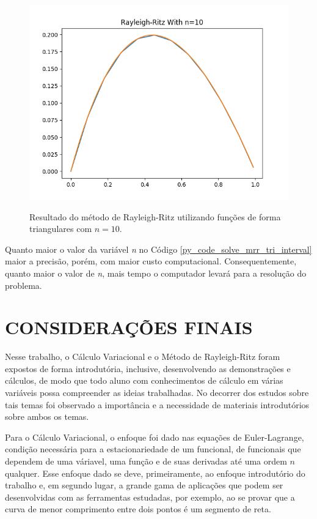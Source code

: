 \documentclass[
	12pt,				%
	openright,			%
    twoside,			%
	a4paper,			%
	english,			%
	french,				%
	spanish,			%
	brazil				%
	]{abntex2}
\numberwithin{lema}{chapter}
\numberwithin{teorema}{chapter}
\numberwithin{definicao}{chapter}
\numberwithin{exemplo}{chapter}
\numberwithin{figure}{chapter}
\begin{document}
\begin{figure}[b]
	\caption{Resultado do método de Rayleigh-Ritz utilizando funções de forma triangulares com $n=10$.}
	\centering
	\includegraphics[scale=0.8]{../figuras/code/code_plot_mrr_triangulate_n10.png}
	\label{fig:code_plot_mrr_triangulate_n10}
\end{figure}

Quanto maior o valor da variável \textit{n} no Código \ref{py_code_solve_mrr_tri_interval} maior a precisão, porém, com maior custo computacional. Consequentemente, quanto maior o valor de \textit{n}, mais tempo o computador levará para a resolução do problema.

\chapter*{CONSIDERAÇÕES FINAIS}

Nesse trabalho, o Cálculo Variacional e o Método de Rayleigh-Ritz foram expostos de forma introdutória, inclusive, desenvolvendo as demonstrações e cálculos, de modo que todo aluno com conhecimentos de cálculo em várias variáveis possa compreender as ideias trabalhadas. No decorrer dos estudos sobre tais temas foi observado a importância e a necessidade de materiais introdutórios sobre ambos os temas.

Para o Cálculo Variacional, o enfoque foi dado nas equações de Euler-Lagrange, condição necessária para a estacionariedade de um funcional, de funcionais que dependem de uma váriavel, uma função e de suas derivadas até uma ordem $n$ qualquer. Esse enfoque dado se deve, primeiramente, ao enfoque introdutório do trabalho e, em segundo lugar, a grande gama de aplicações que podem ser desenvolvidas com as ferramentas estudadas, por exemplo, ao se provar que a curva de menor comprimento entre dois pontos é um segmento de reta.
\end{document}
